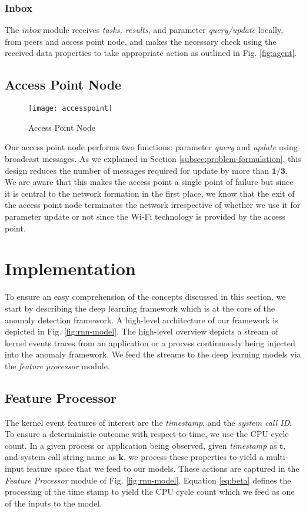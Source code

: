 \subsubsection{Inbox}
The \emph{inbox} module receives \emph{tasks, results}, and 
parameter \emph{query/update} locally, from peers 
and access point node, and makes the necessary check using 
the 
received data properties to take appropriate action as 
outlined in Fig. \ref{fig:agent}. 
\subsection{Access Point Node}
\begin{figure}[!t]
	\centering
	\texttt{[image: accesspoint]} 
	\caption{Access Point Node}
	\label{fig:access-point}
\end{figure}
Our access point node performs two functions: parameter 
\emph{query} and \emph{update} using broadcast messages. As 
we explained in Section \ref{subsec:problem-formulation}, 
this design reduces the number of messages required for 
update by more than $ \bm{1/3} $. We are aware that this 
makes the access point a single point of failure but since it 
is central to the network formation in the first place, we 
know that the exit of the access point node terminates the 
network irrespective of whether we use it for parameter 
update or not since the Wi-Fi technology is provided by the 
access point.
\section{Implementation}
\label{sec:implementation}
To ensure an easy comprehension of the concepts discussed in 
this section, we start by describing the deep learning 
framework which is at the core of the anomaly detection 
framework. A high-level architecture of our framework is 
depicted in Fig. 
\ref{fig:rnn-model}. The 
high-level 
overview depicts a stream of kernel events traces from an 
application or a process continuously being injected into the 
anomaly framework.
We feed the streams to the deep learning models via the 
\emph{feature 
	processor} module. 

\subsection{Feature Processor}
The kernel event features of interest are the 
\emph{timestamp}, and the \emph{system call ID}. To ensure a 
deterministic 
outcome with respect to time, we use the 
CPU cycle count. In a given process or application being 
observed, given \emph{timestamp} 
as $\mathbf{t} $, and system call string name as $ \mathbf{k} 
$, we process these properties to 
yield a multi-input feature space that we feed to our models. 
These actions are captured in the \emph{Feature Processor} 
module of Fig. \ref{fig:rnn-model}. Equation 
\eqref{eq:beta} defines the processing of the time stamp to 
yield the CPU cycle count which we feed as one of the inputs 
to the model.

